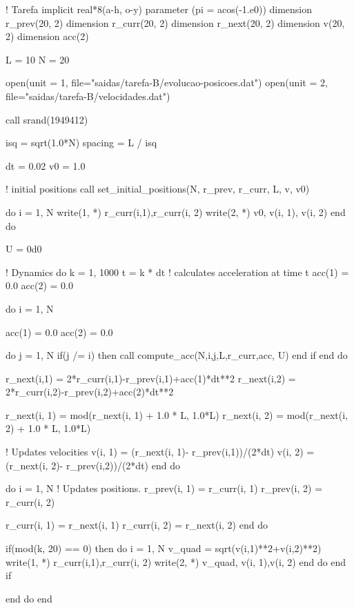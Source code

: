       !     Tarefa 
      implicit real*8(a-h, o-y)
      parameter (pi = acos(-1.e0))
      dimension r_prev(20, 2)
      dimension r_curr(20, 2)
      dimension r_next(20, 2)
      dimension v(20, 2)
      dimension acc(2)

      L = 10
      N = 20
      
      open(unit = 1, file="saidas/tarefa-B/evolucao-posicoes.dat")
      open(unit = 2, file="saidas/tarefa-B/velocidades.dat")

      call srand(1949412)

      isq = sqrt(1.0*N)
      spacing = L / isq

      dt = 0.02
      v0 = 1.0

      ! initial positions
      call set_initial_positions(N, r_prev, r_curr, L, v, v0)

      do i = 1, N
            write(1, *) r_curr(i,1),r_curr(i, 2)
            write(2, *) v0, v(i, 1), v(i, 2)
      end do

      U = 0d0

      ! Dynamics 
      do k = 1, 1000
            t = k * dt 
            ! calculates acceleration at time t
            acc(1) = 0.0
            acc(2) = 0.0

            do i = 1, N 
            
                  acc(1) = 0.0
                  acc(2) = 0.0

                  do j = 1, N
                        if(j /= i) then 
                              call compute_acc(N,i,j,L,r_curr,acc, U)
                        end if
                  end do

                  r_next(i,1) = 2*r_curr(i,1)-r_prev(i,1)+acc(1)*dt**2
                  r_next(i,2) = 2*r_curr(i,2)-r_prev(i,2)+acc(2)*dt**2

                  r_next(i, 1) = mod(r_next(i, 1) + 1.0 * L, 1.0*L) 
                  r_next(i, 2) = mod(r_next(i, 2) + 1.0 * L, 1.0*L)

                  ! Updates velocities 
                  v(i, 1) = (r_next(i, 1)- r_prev(i,1))/(2*dt)
                  v(i, 2) = (r_next(i, 2)- r_prev(i,2))/(2*dt)
            end do

            do i = 1, N 
                  ! Updates positions. 
                  r_prev(i, 1) = r_curr(i, 1)
                  r_prev(i, 2) = r_curr(i, 2)

                  r_curr(i, 1) = r_next(i, 1) 
                  r_curr(i, 2) = r_next(i, 2)
            end do
            
            if(mod(k, 20) == 0) then 
                  do i = 1, N 
                        v_quad = sqrt(v(i,1)**2+v(i,2)**2)
                        write(1, *) r_curr(i,1),r_curr(i, 2)
                        write(2, *) v_quad, v(i, 1),v(i, 2)
                  end do
            end if

      end do
      end